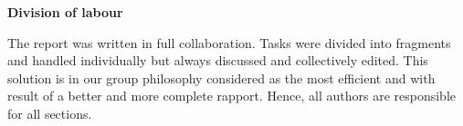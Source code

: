 \vspace{1cm}
\begin{center}
\textbf{Division of labour}
\end{center}
\noindent
The report was written in full collaboration. Tasks were divided into
fragments and handled individually but always discussed and collectively
edited. This solution is in our group philosophy considered as the most
efficient and with result of a better and more complete rapport. Hence, all authors are responsible for all sections.


